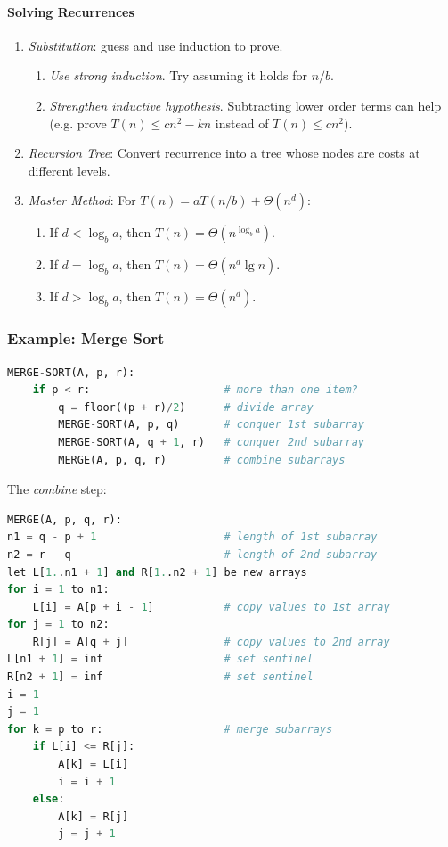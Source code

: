 \documentclass[twocolumn,english]{article}
\numberwithin{equation}{section}
\numberwithin{figure}{section}
\numberwithin{table}{section}
\begin{document}
\paragraph{Solving Recurrences}
\begin{enumerate}
\item \emph{Substitution}: guess and use induction to prove.
\begin{enumerate}
\item \emph{Use strong induction}. Try assuming it holds for $n/b$.
\item \emph{Strengthen inductive hypothesis}. Subtracting lower order terms
can help (e.g. prove $T\left(n\right)\leq cn^{2}-kn$ instead of $T\left(n\right)\leq cn^{2}$).
\end{enumerate}
\item \emph{Recursion Tree}: Convert recurrence into a tree whose nodes
are costs at different levels.
\item \emph{Master Method}: For $T\left(n\right)=aT\left(n/b\right)+\Theta(n^{d})$:
\begin{enumerate}
\item If $d<\log_{b}a$, then $T\left(n\right)=\Theta\left(n^{\log_{b}a}\right)$.
\item If $d=\log_{b}a$, then $T\left(n\right)=\Theta\left(n^{d}\lg n\right)$.
\item If $d>\log_{b}a$, then $T\left(n\right)=\Theta\left(n^{d}\right)$.
\end{enumerate}
\end{enumerate}

\subsubsection*{Example: Merge Sort}

\begin{lstlisting}[language=Python,basicstyle={\footnotesize\ttfamily},tabsize=4,frame=single]
MERGE-SORT(A, p, r):
	if p < r:                     # more than one item?
		q = floor((p + r)/2)      # divide array
		MERGE-SORT(A, p, q)       # conquer 1st subarray
		MERGE-SORT(A, q + 1, r)   # conquer 2nd subarray
		MERGE(A, p, q, r)         # combine subarrays
\end{lstlisting}

The \emph{combine} step:

\begin{lstlisting}[language=Python,basicstyle={\footnotesize\ttfamily},tabsize=4,frame=single]
MERGE(A, p, q, r):
n1 = q - p + 1                    # length of 1st subarray
n2 = r - q                        # length of 2nd subarray
let L[1..n1 + 1] and R[1..n2 + 1] be new arrays
for i = 1 to n1:
	L[i] = A[p + i - 1]           # copy values to 1st array
for j = 1 to n2:
	R[j] = A[q + j]               # copy values to 2nd array
L[n1 + 1] = inf                   # set sentinel
R[n2 + 1] = inf                   # set sentinel
i = 1
j = 1
for k = p to r:                   # merge subarrays
	if L[i] <= R[j]:
		A[k] = L[i]
		i = i + 1
	else:
		A[k] = R[j]
		j = j + 1
\end{lstlisting}
\end{document}
